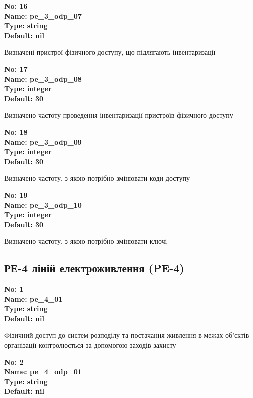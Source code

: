 \documentclass{article}
\begin{document}
{\footnotesize\bfseries
No: 16\\
Name: pe\_\allowbreak{}3\_\allowbreak{}odp\_\allowbreak{}07\\
Type: string\\
Default: nil
}

{\footnotesize Визначені пристрої фізичного доступу, що підлягають інвентаризації}


{\footnotesize\bfseries
No: 17\\
Name: pe\_\allowbreak{}3\_\allowbreak{}odp\_\allowbreak{}08\\
Type: integer\\
Default: 30
}

{\footnotesize Визначено частоту проведення інвентаризації пристроїв фізичного доступу}


{\footnotesize\bfseries
No: 18\\
Name: pe\_\allowbreak{}3\_\allowbreak{}odp\_\allowbreak{}09\\
Type: integer\\
Default: 30
}

{\footnotesize Визначено частоту, з якою потрібно змінювати коди доступу}


{\footnotesize\bfseries
No: 19\\
Name: pe\_\allowbreak{}3\_\allowbreak{}odp\_\allowbreak{}10\\
Type: integer\\
Default: 30
}

{\footnotesize Визначено частоту, з якою потрібно змінювати ключі}




\subsection{РЕ-4 ліній електроживлення (PE-4)}


\vspace{10pt}
{\footnotesize\bfseries
No: 1\\
Name: pe\_\allowbreak{}4\_\allowbreak{}01\\
Type: string\\
Default: nil
}

{\footnotesize Фізичний доступ до систем розподілу та постачання живлення в межах об'єктів організації контролюється за допомогою заходів захисту}


{\footnotesize\bfseries
No: 2\\
Name: pe\_\allowbreak{}4\_\allowbreak{}odp\_\allowbreak{}01\\
Type: string\\
Default: nil
}
\end{document}

